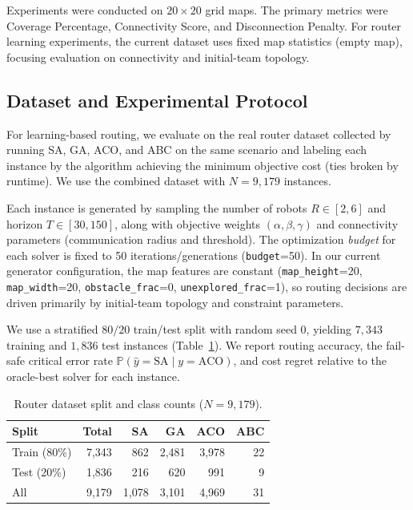 \documentclass[conference]{IEEEtran}
\begin{document}
Experiments were conducted on $20 \times 20$ grid maps. The primary metrics were Coverage Percentage, Connectivity Score, and Disconnection Penalty. For router learning experiments, the current dataset uses fixed map statistics (empty map), focusing evaluation on connectivity and initial-team topology.

\subsection{Dataset and Experimental Protocol}
\label{sec:dataset_protocol}
For learning-based routing, we evaluate on the real router dataset collected by running SA, GA, ACO, and ABC on the same scenario and labeling each instance by the algorithm achieving the minimum objective cost (ties broken by runtime). We use the combined dataset with $N=9{,}179$ instances.

Each instance is generated by sampling the number of robots $R \in [2,6]$ and horizon $T \in [30,150]$, along with objective weights $(\alpha,\beta,\gamma)$ and connectivity parameters (communication radius and threshold). The optimization \emph{budget} for each solver is fixed to 50 iterations/generations (\texttt{budget}=50). In our current generator configuration, the map features are constant (\texttt{map\_height}=20, \texttt{map\_width}=20, \texttt{obstacle\_frac}=0, \texttt{unexplored\_frac}=1), so routing decisions are driven primarily by initial-team topology and constraint parameters.

We use a stratified $80/20$ train/test split with random seed 0, yielding $7{,}343$ training and $1{,}836$ test instances (Table~\ref{tab:router_dataset_split}). We report routing accuracy, the fail-safe critical error rate $\mathbb{P}(\hat{y}=\text{SA} \mid y=\text{ACO})$, and cost regret relative to the oracle-best solver for each instance.

\begin{table}[t]
    \centering
    \caption{Router dataset split and class counts ($N=9{,}179$).}
    \label{tab:router_dataset_split}
    \begin{tabular}{@{}lrrrrr@{}}
        \toprule
        \textbf{Split} & \textbf{Total} & \textbf{SA} & \textbf{GA} & \textbf{ACO} & \textbf{ABC} \\
        \midrule
        Train (80\%) & 7,343 & 862 & 2,481 & 3,978 & 22 \\
        Test (20\%)  & 1,836 & 216 & 620 & 991 & 9 \\
        \midrule
        All          & 9,179 & 1,078 & 3,101 & 4,969 & 31 \\
        \bottomrule
    \end{tabular}
\end{table}
\end{document}
